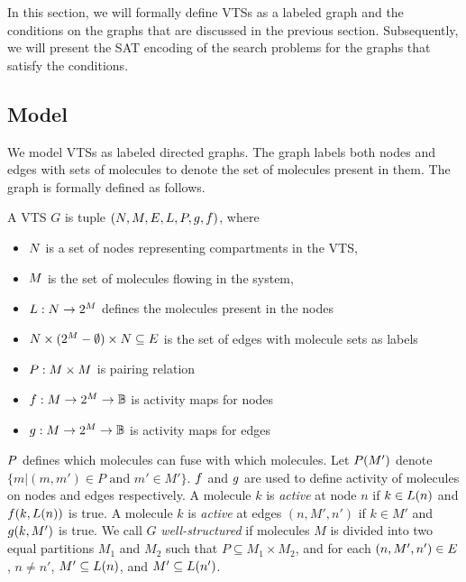 In this section, we will formally define VTSs as a labeled graph
and the conditions on the graphs that are discussed in the previous
section.
%
Subsequently, we will present the SAT encoding of the search problems
for the graphs that satisfy the conditions.

\subsection{Model}

We model VTSs as labeled directed graphs.
The graph labels both nodes and edges with sets of molecules to denote
the set of molecules present in them.
The graph is formally defined as follows.

\begin{df}
  A VTS $G$ is tuple $(N,M,E,L,P,g,f)$, where
  \begin{itemize}
  \item $N$ is a set of nodes representing compartments in the VTS,
  \item $M$ is the set of molecules flowing in the system, 
  \item $L : N \rightarrow 2^{M}$ defines the molecules present in the nodes  
  \item $ N \times (2^{M}-\emptyset) \times N \subseteq E$ is the
    set of edges with molecule sets as labels
  \item $P : M \times M$ is pairing relation
  \item $f : M \rightarrow 2^{M} \rightarrow \mathbb{B}$ is activity maps for nodes
  \item $g : M \rightarrow 2^{M} \rightarrow \mathbb{B} $ is activity maps for edges
  \end{itemize}
\end{df}
$P$ defines which molecules can fuse with which molecules.
%
Let $P(M')$ denote $\{m|(m,m') \in P \text{ and } m' \in M'\}$.
%
$f$ and $g$ are used to define activity of molecules on
nodes and edges respectively.
%
A molecule $k$ is {\em active} at node $n$ if $k \in L(n)$ and
$f(k,L(n))$ is true.
%
A molecule $k$ is {\em active} at edges $(n,M',n')$ if $k \in M'$ and
$g(k,M')$ is true.
%
We call $G$ {\em well-structured} if molecules $M$ is divided into
two equal partitions $M_1$ and $M_2$ such that $P \subseteq M_1 \times M_2$, and
for each $(n,M',n') \in E$, $n \neq n'$, 
$M' \subseteq L(n)$, and $M' \subseteq L(n')$.
%

